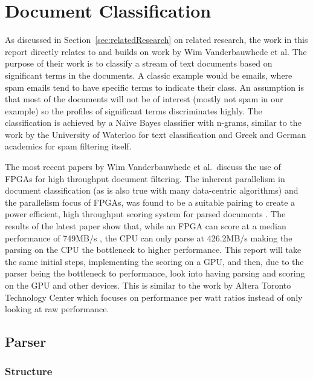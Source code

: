\section{Document Classification}

As discussed in Section~\ref{sec:relatedResearch} on related research, the work
in this report directly relates to and builds on work by Wim Vanderbauwhede et
al. The purpose of their work is to classify a stream of text documents based on
significant terms in the documents. A classic example would be emails, where
spam emails tend to have specific terms to indicate their class. An assumption
is that most of the documents will not be of interest (mostly not spam in our
example) so the profiles of significant terms discriminates highly. The
classification is achieved by a Na{\"{\i}}ve Bayes classifier with n-grams,
similar to the work by the University of Waterloo \cite{peng2003combining} for
text classification and Greek \cite{metsis2006spam} and German
\cite{Schneider:2003:CEM:1067807.1067848} academics for spam filtering itself.

The most recent papers by Wim Vanderbauwhede et al.\ discuss the use of FPGAs
for high throughput document filtering. The inherent parallelism in document
classification (as is also true with many data-centric algorithms) and the
parallelism focus of FPGAs, was found to be a suitable pairing to create a power
efficient, high throughput scoring system for parsed documents
\cite{vanderbauwhede2013high} \cite{HybridCPUFPGA}. The results of the latest
paper show that, while an FPGA can score at a median performance of 749MB/s
\cite{vanderbauwhede2013high}, the CPU can only parse at 426.2MB/s making the
parsing on the CPU the bottleneck to higher performance. This report will take
the same initial steps, implementing the scoring on a GPU, and then, due to the
parser being the bottleneck to performance, look into having parsing and scoring
on the GPU and other devices. This is similar to the work by Altera Toronto
Technology Center which focuses on performance per watt ratios
\cite{chen2012invited} instead of only looking at raw performance.

\subsection{Parser}

\subsubsection{Structure}

